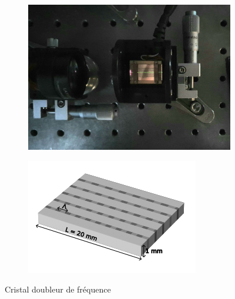 \documentclass[11pt,a4paper]{article}
\begin{document}
\begin{figure}[h]
\centering
\begin{subfigure}{0.45\textwidth}
	\includegraphics[width=\textwidth]{./img/cristal clair.jpg}
\end{subfigure}
\begin{subfigure}{0.5\textwidth}
	\includegraphics[width=\textwidth]{./img/cristal.png}
\end{subfigure}
\caption{Cristal doubleur de fréquence}
\label{fig:cristal}
\end{figure}
\end{document}

